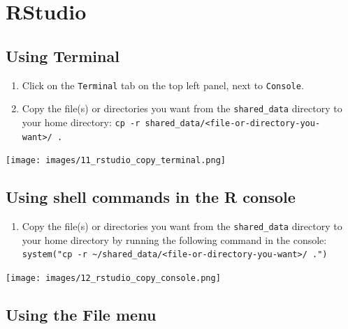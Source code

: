 \documentclass[]{book}
\providecommand{\tightlist}{%
  \setlength{\itemsep}{0pt}\setlength{\parskip}{0pt}}
\begin{document}
\hypertarget{rstudio-2}{%
\section{RStudio}\label{rstudio-2}}

\hypertarget{using-terminal}{%
\subsection{Using Terminal}\label{using-terminal}}

\begin{enumerate}
\def\labelenumi{\arabic{enumi}.}
\tightlist
\item
  Click on the \texttt{Terminal} tab on the top left panel, next to \texttt{Console}.
\item
  Copy the file(s) or directories you want from the \texttt{shared\_data} directory to your home directory: \texttt{cp\ -r\ shared\_data/\textless{}file-or-directory-you-want\textgreater{}/\ .}
\end{enumerate}

\texttt{[image: images/11\_rstudio\_copy\_terminal.png]}

\hypertarget{using-shell-commands-in-the-r-console}{%
\subsection{Using shell commands in the R console}\label{using-shell-commands-in-the-r-console}}

\begin{enumerate}
\def\labelenumi{\arabic{enumi}.}
\tightlist
\item
  Copy the file(s) or directories you want from the \texttt{shared\_data} directory to your home directory by running the following command in the console: \texttt{system("cp\ -r\ \textasciitilde{}/shared\_data/\textless{}file-or-directory-you-want\textgreater{}/\ .")}
\end{enumerate}

\texttt{[image: images/12\_rstudio\_copy\_console.png]}

\hypertarget{using-the-file-menu}{%
\subsection{Using the File menu}\label{using-the-file-menu}}
\end{document}
